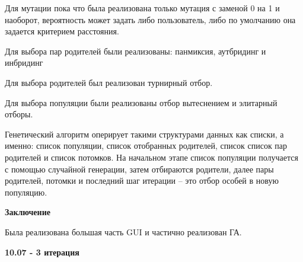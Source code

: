 \documentclass{article}
\begin{document}
\begin{enumerate}
\begin{figure}[h]
\label{fig:mpr}

\end{figure}

Для мутации пока что была реализована только мутация с заменой 0 на 1 и наоборот, вероятность может задать либо пользователь, либо по умолчанию она задается критерием расстояния.

Для выбора пар родителей были реализованы: панмиксия, аутбридинг и инбридинг

Для выбора родителей был реализован турнирный отбор.

Для выбора популяции были реализованы отбор вытеснением и элитарный отборы.

Генетический алгоритм оперирует такими структурами данных как списки, а именно: список популяции, список отобранных родителей, список список пар родителей и список потомков. На начальном этапе список популяции получается с помощью случайной генерации, затем отбираются родители, далее пары родителей, потомки и последний шаг итерации -- это отбор особей в новую популяцию.
\end{enumerate}

\textbf{Заключение}

Была реализована большая часть GUI и частично реализован ГА.

\textbf{10.07 - 3 итерация}
\end{document}
